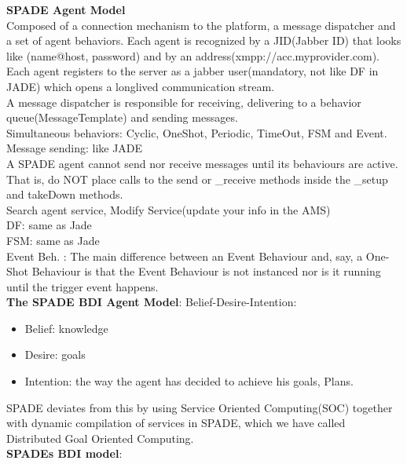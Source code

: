 \documentclass[a4paper, 11pt]{article}
\begin{document}
\textbf{SPADE Agent Model}\\
Composed of a connection mechanism to the platform, a message dispatcher and a set of agent behaviors. Each agent is recognized by a JID(Jabber ID) that looks like (name@host, password) and by an address(xmpp://acc.myprovider.com). Each agent registers to the server as a jabber user(mandatory, not like DF in JADE) which opens a longlived communication stream. \\
A message dispatcher is responsible for receiving, delivering to a behavior queue(MessageTemplate) and sending messages. \\
Simultaneous behaviors: Cyclic, OneShot, Periodic, TimeOut, FSM and Event. \\
Message sending: like JADE \\
A SPADE agent cannot send nor receive messages until its behaviours are active. That is, do NOT place calls to the send or \_receive methods inside the \_setup and takeDown methods. \\
Search agent service, Modify Service(update your info in the AMS) \\
DF: same as Jade \\
FSM: same as Jade \\
Event Beh. : The main difference between an Event Behaviour and, say, a One-Shot Behaviour is that the Event Behaviour is not instanced nor is it running until the trigger event happens.\\
\textbf{The SPADE BDI Agent Model}: Belief-Desire-Intention:
\begin{itemize}
	\item Belief: knowledge
	\item Desire: goals
	\item Intention: the way the agent has decided to achieve his goals, Plans.
\end{itemize}
SPADE deviates from this by using Service Oriented Computing(SOC) together with dynamic compilation of services in SPADE, which we have called Distributed Goal Oriented Computing. \\
\textbf{SPADEs BDI model}:
\end{document}

